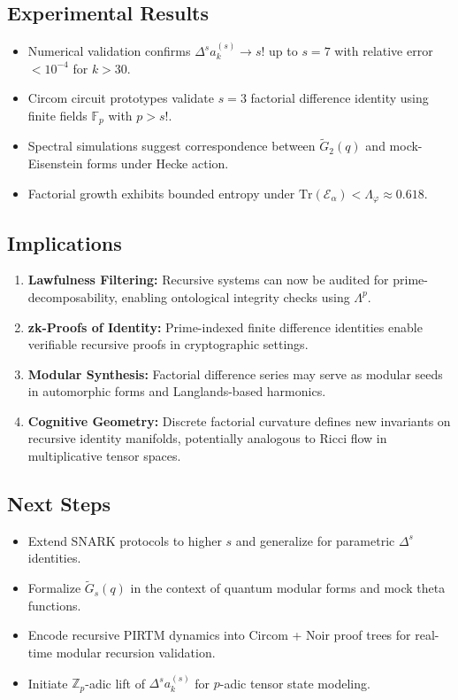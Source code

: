 \documentclass[12]{amsart}
\theoremstyle{plain}
\begin{document}
\subsection{Experimental Results}

\begin{itemize}
  \item Numerical validation confirms $\Delta^s a_k^{(s)} \to s!$ up to $s=7$ with relative error $< 10^{-4}$ for $k > 30$.
  \item Circom circuit prototypes validate $s=3$ factorial difference identity using finite fields $\mathbb{F}_{p}$ with $p > s!$.
  \item Spectral simulations suggest correspondence between $\widetilde{G}_2(q)$ and mock-Eisenstein forms under Hecke action.
  \item Factorial growth exhibits bounded entropy under $\text{Tr}(\mathcal{E}_\alpha) < \Lambda_\varphi \approx 0.618$.
\end{itemize}

\subsection{Implications}

\begin{enumerate}
  \item \textbf{Lawfulness Filtering:} Recursive systems can now be audited for prime-decomposability, enabling ontological integrity checks using $\Lambda^p$.
  \item \textbf{zk-Proofs of Identity:} Prime-indexed finite difference identities enable verifiable recursive proofs in cryptographic settings.
  \item \textbf{Modular Synthesis:} Factorial difference series may serve as modular seeds in automorphic forms and Langlands-based harmonics.
  \item \textbf{Cognitive Geometry:} Discrete factorial curvature defines new invariants on recursive identity manifolds, potentially analogous to Ricci flow in multiplicative tensor spaces.
\end{enumerate}

\subsection{Next Steps}

\begin{itemize}
  \item Extend SNARK protocols to higher $s$ and generalize for parametric $\Delta^s$ identities.
  \item Formalize $\widetilde{G}_s(q)$ in the context of quantum modular forms and mock theta functions.
  \item Encode recursive PIRTM dynamics into Circom + Noir proof trees for real-time modular recursion validation.
  \item Initiate $\mathbb{Z}_p$-adic lift of $\Delta^s a_k^{(s)}$ for $p$-adic tensor state modeling.
\end{itemize}
\end{document}
